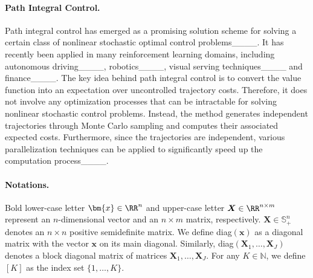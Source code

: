 \paragraph{Path Integral Control.}
Path integral control has emerged as a promising solution scheme for solving a certain class of nonlinear stochastic optimal control problems____. It has recently been applied in many reinforcement learning domains, including autonomous driving____, robotics____, visual serving techniques____ and finance____. The key idea behind path integral control is to convert the value function into an expectation over uncontrolled trajectory costs. Therefore, it does not involve any optimization processes that can be intractable for solving nonlinear stochastic control problems. Instead, the method generates independent trajectories through Monte Carlo sampling and computes their associated expected costs. Furthermore, since the trajectories are independent, various parallelization techniques can be applied to significantly speed up the computation process____.

\paragraph{Notations.} 
Bold lower-case letter $\bm{x}\in\RR^n$ and upper-case letter $\boldsymbol{X}\in\RR^{n\times m}$ represent an $n$-dimensional vector and an $n\times m$ matrix, respectively.
$\bm{X}\in\mathbb{S}^n_{+}$ denotes an $n\times n$ positive semidefinite matrix. We define diag$(\bm{x})$ as a diagonal matrix with the vector $\bm{x}$ on its main diagonal. Similarly, diag$(\bm{X}_1,\ldots,\bm{X}_J)$ denotes a block diagonal matrix of matrices $\bm{X}_1,\ldots,\bm{X}_J$. For any $K \in \mathbb N$, we define $[K]$ as the index set $\{1,\dots,K\}$.